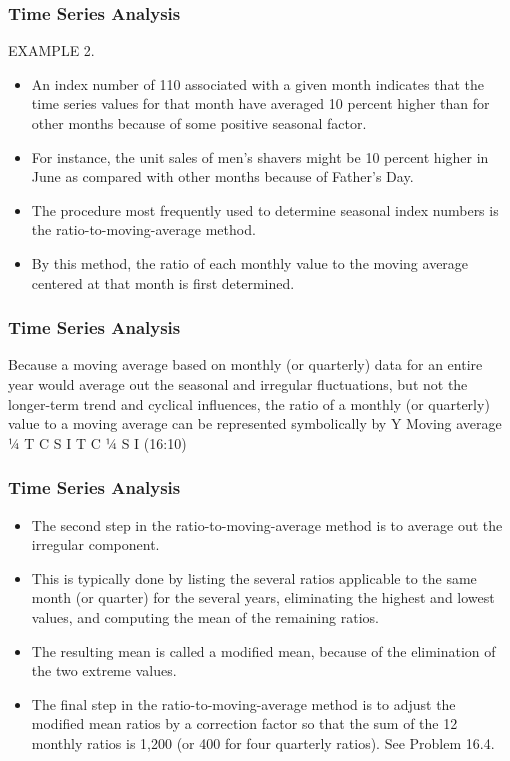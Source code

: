 \begin{frame}
\frametitle{Time Series Analysis}
EXAMPLE 2. 
\begin{itemize}
\item An index number of 110 associated with a given month indicates that the time series values for that month
have averaged 10 percent higher than for other months because of some positive seasonal factor. 
\item For instance, the unit sales
of men’s shavers might be 10 percent higher in June as compared with other months because of Father’s Day.
\item The procedure most frequently used to determine seasonal index numbers is the ratio-to-moving-average
method.
\item By this method, the ratio of each monthly value to the moving average centered at that month is first
determined. 
\end{itemize}
\end{frame}
\begin{frame}
\frametitle{Time Series Analysis}
Because a moving average based on monthly (or quarterly) data for an entire year would average
out the seasonal and irregular fluctuations, but not the longer-term trend and cyclical influences, the ratio of a
monthly (or quarterly) value to a moving average can be represented symbolically by
Y
Moving average
¼
T   C   S   I
T   C
¼ S   I (16:10)

\end{frame}
\begin{frame}
\frametitle{Time Series Analysis}
\begin{itemize}
\item The second step in the ratio-to-moving-average method is to average out the irregular component.
\item  This is
typically done by listing the several ratios applicable to the same month (or quarter) for the several years,
eliminating the highest and lowest values, and computing the mean of the remaining ratios.
\item  The resulting mean
is called a modified mean, because of the elimination of the two extreme values.
\item The final step in the ratio-to-moving-average method is to adjust the modified mean ratios by a
correction factor so that the sum of the 12 monthly ratios is 1,200 (or 400 for four quarterly ratios). See
Problem 16.4.
\end{itemize}
\end{frame}

